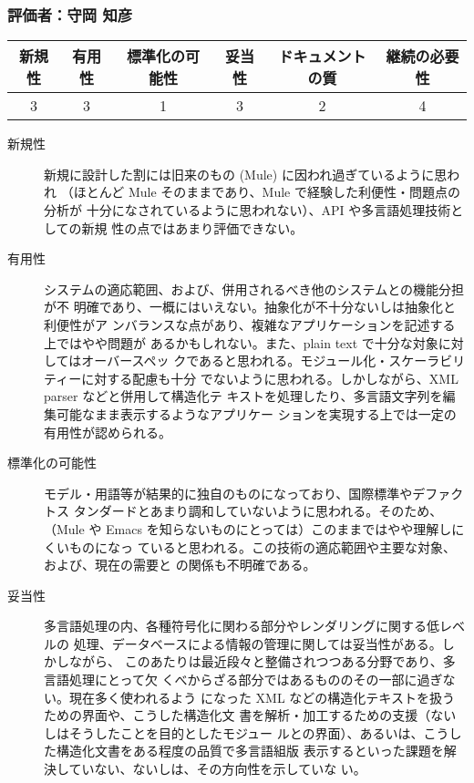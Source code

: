 \subsubsection{評価者：守岡 知彦}

\begin{tabular}{|c|c|c|c|c|c|}
\hline
 新規性 & 有用性 & 標準化の可能性 & 妥当性 & ドキュメントの質 & 継続の必要性 \\
\hline
 3 & 3 & 1 & 3 & 2 & 4 \\
\hline
\end{tabular}

\begin{description}
\item[新規性]

新規に設計した割には旧来のもの (Mule) に因われ過ぎているように思われ
（ほとんど Mule そのままであり、Mule で経験した利便性・問題点の分析が
十分になされているように思われない）、API や多言語処理技術としての新規
性の点ではあまり評価できない。

\item[有用性]

システムの適応範囲、および、併用されるべき他のシステムとの機能分担が不
明確であり、一概にはいえない。抽象化が不十分ないしは抽象化と利便性がア
ンバランスな点があり、複雑なアプリケーションを記述する上ではやや問題が
あるかもしれない。また、plain text で十分な対象に対してはオーバースペッ
クであると思われる。モジュール化・スケーラビリティーに対する配慮も十分
でないように思われる。しかしながら、XML parser などと併用して構造化テ
キストを処理したり、多言語文字列を編集可能なまま表示するようなアプリケー
ションを実現する上では一定の有用性が認められる。

\item[標準化の可能性]

モデル・用語等が結果的に独自のものになっており、国際標準やデファクトス
タンダードとあまり調和していないように思われる。そのため、（Mule や
Emacs を知らないものにとっては）このままではやや理解しにくいものになっ
ていると思われる。この技術の適応範囲や主要な対象、および、現在の需要と
の関係も不明確である。

\item[妥当性]

多言語処理の内、各種符号化に関わる部分やレンダリングに関する低レベルの
処理、データベースによる情報の管理に関しては妥当性がある。しかしながら、
このあたりは最近段々と整備されつつある分野であり、多言語処理にとって欠
くべからざる部分ではあるもののその一部に過ぎない。現在多く使われるよう
になった XML などの構造化テキストを扱うための界面や、こうした構造化文
書を解析・加工するための支援（ないしはそうしたことを目的としたモジュー
ルとの界面）、あるいは、こうした構造化文書をある程度の品質で多言語組版
表示するといった課題を解決していない、ないしは、その方向性を示していな
い。


\end{description}
